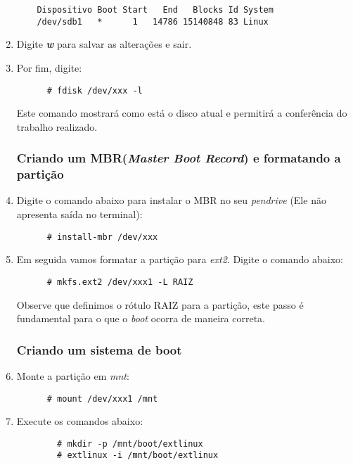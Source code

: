\documentclass[a4paper,10pt]{article}
\begin{document}
\begin{enumerate}
\begin{lstlisting}
	Dispositivo Boot Start   End   Blocks Id System
	/dev/sdb1   *      1   14786 15140848 83 Linux
	\end{lstlisting}

    \item Digite \emph{\textbf{w}} para salvar as alterações e sair.

    \item Por fim, digite:
      \begin{lstlisting}
      # fdisk /dev/xxx -l
      \end{lstlisting}
      Este comando mostrará como está o disco atual e permitirá a conferência do trabalho realizado.

      \subsubsection{Criando um MBR(\emph{Master Boot Record}) e formatando a partição}

	\item Digite o comando abaixo para instalar o MBR no seu \emph{pendrive} (Ele não apresenta 
	  saída no terminal):
	  \begin{lstlisting}
	  # install-mbr /dev/xxx
	  \end{lstlisting}

	\item Em seguida vamos formatar a partição para \emph{ext2}. Digite o comando abaixo:
	  \begin{lstlisting}
	  # mkfs.ext2 /dev/xxx1 -L RAIZ
	  \end{lstlisting}
	  Observe que definimos o rótulo RAIZ para a partição, este passo é fundamental para o que o
	  \emph{boot} ocorra de maneira correta.
      \subsubsection{Criando um sistema de boot}  
	
	\item Monte a partição em \emph{mnt}:	
	  \begin{lstlisting}
	  # mount /dev/xxx1 /mnt
	  \end{lstlisting}

	\item Execute os comandos abaixo:
	  \begin{lstlisting}
	    # mkdir -p /mnt/boot/extlinux
	    # extlinux -i /mnt/boot/extlinux
	  \end{lstlisting}
      \end{enumerate}
\end{document}
